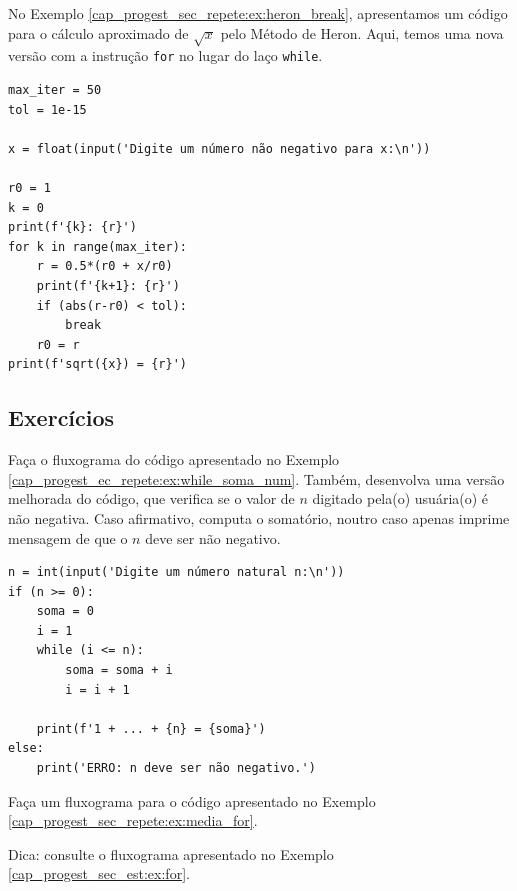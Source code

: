 \begin{ex}
  No Exemplo \ref{cap_progest_sec_repete:ex:heron_break}, apresentamos um código para o cálculo aproximado de $\sqrt{x}$ pelo Método de Heron. Aqui, temos uma nova versão com a instrução \lstinline+for+ no lugar do laço \lstinline+while+.

\begin{lstlisting}
max_iter = 50
tol = 1e-15

x = float(input('Digite um número não negativo para x:\n'))

r0 = 1
k = 0
print(f'{k}: {r}')
for k in range(max_iter):
    r = 0.5*(r0 + x/r0)
    print(f'{k+1}: {r}')
    if (abs(r-r0) < tol):
        break
    r0 = r
print(f'sqrt({x}) = {r}')
\end{lstlisting}

\end{ex}

\subsection{Exercícios}

\begin{exer}
  Faça o fluxograma do código apresentado no Exemplo \ref{cap_progest_ec_repete:ex:while_soma_num}. Também, desenvolva uma versão melhorada do código, que verifica se o valor de $n$ digitado pela(o) usuária(o) é não negativa. Caso afirmativo, computa o somatório, noutro caso apenas imprime mensagem de que o $n$ deve ser não negativo.
\end{exer}
\begin{resp}

\begin{lstlisting}
n = int(input('Digite um número natural n:\n'))
if (n >= 0):
    soma = 0
    i = 1
    while (i <= n):
        soma = soma + i
        i = i + 1

    print(f'1 + ... + {n} = {soma}')
else:
    print('ERRO: n deve ser não negativo.')
\end{lstlisting}

\end{resp}

\begin{exer}
  Faça um fluxograma para o código apresentado no Exemplo \ref{cap_progest_sec_repete:ex:media_for}.
\end{exer}
\begin{resp}
  Dica: consulte o fluxograma apresentado no Exemplo \ref{cap_progest_sec_est:ex:for}.
\end{resp}

